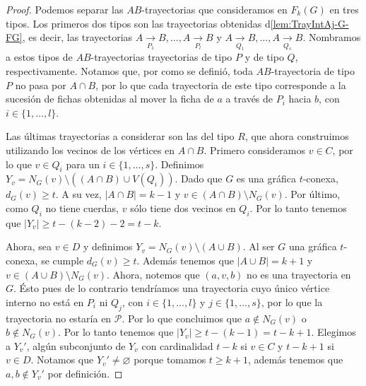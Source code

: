 \begin{proof}
    Podemos separar las $AB$-trayectorias que consideramos en $F_{k}(G)$ en tres
    tipos. Los primeros dos tipos son las trayectorias obtenidas
    d\cref{lem:TrayIntAj-G-FG}, es decir, las trayectorias $A
    \xrightarrow[P_1]{}  B, \dots, A \xrightarrow[P_l]{}  B$ y $A
    \xrightarrow[Q_1]{}  B, \dots, A \xrightarrow[Q_s]{}  B$. Nombramos a estos
    tipos de $AB$-trayectorias trayectorias de tipo $P$ y de tipo $Q$,
    respectivamente. Notamos que, por como se defini\'o, toda $AB$-trayectoria
    de tipo $P$ no pasa por $A\cap B$, por lo que cada trayectoria de este tipo
    corresponde a la sucesi\'on de fichas obtenidas al mover la ficha de $a$ a
    trav\'es de $P_i$ hacia $b$, con $i \in \{1, \dots, l\}$.
    
    Las \'ultimas trayectorias a considerar son las del tipo $R$, que ahora
    construimos utilizando los vecinos de los v\'ertices en $A \cap B$. Primero
    consideramos $v \in C$, por lo que $v \in Q_i$ para un  $i \in \{1, \dots,
    s\}$. Definimos $Y_v = N_G(v) \setminus ((A \cap B) \cup V(Q_i))$. Dado que
    $G$ es una gr\'afica $t$-conexa, $d_G(v) \geq t$. A su vez, $|A \cap B| =k
    -1$ y $v \in (A \cap B) \setminus N_G(v)$. Por \'ultimo, como $Q_i$ no tiene
    cuerdas, $v$ s\'olo tiene dos vecinos en $Q_i$. Por lo tanto tenemos que
    $|Y_v| \geq t- (k-2)-2 = t-k$. 
    
    Ahora, sea $v \in D$ y definimos $Y_v = N_G(v) \setminus (A \cup B)$. Al ser
    $G$ una gr\'afica $t$-conexa, se cumple $d_G(v) \geq t$. Adem\'as tenemos
    que $|A \cup B| = k + 1$ y $v \in (A \cup B) \setminus N_G(v)$. Ahora,
    notemos que $(a, v, b)$ no es una trayectoria en $G$. \'Esto pues de lo
    contrario tendr\'iamos una trayectoria cuyo \'unico v\'ertice interno no
    est\'a en $P_i$ ni $Q_j$, con $i \in \{1, \dots, l\}$ y $j \in \{1, \dots,
    s\}$, por lo que la trayectoria no estar\'ia en $\mathcal{P}$. Por lo que
    concluimos que $a \notin N_G(v)$ o $b \notin N_G(v)$. Por lo tanto tenemos
    que $|Y_v| \geq t- (k-1) = t-k + 1$. Elegimos a $Y_v '$, alg\'un subconjunto
    de $Y_v$ con cardinalidad $t-k$ si $v \in C$ y $t- k+ 1$ si $v \in D$.
    Notamos que $Y_v ' \neq \varnothing$ porque tomamos $t \geq k + 1$, adem\'as
    tenemos que $a, b \notin Y_v '$ por definici\'on. 


\end{proof}
